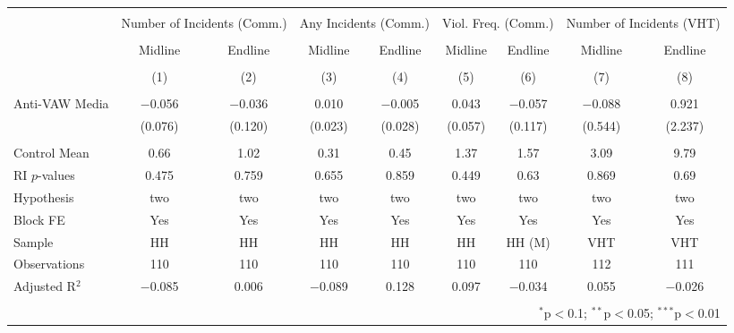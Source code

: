 
\begin{tabular}{@{\extracolsep{5pt}}lcccccccc} 
\\[-1.8ex]\hline 
\hline \\[-1.8ex] 
 & \multicolumn{2}{c}{Number of Incidents (Comm.)} & \multicolumn{2}{c}{Any Incidents (Comm.)} & \multicolumn{2}{c}{Viol. Freq. (Comm.)} & \multicolumn{2}{c}{Number of Incidents (VHT)} \\ 
\\[-1.8ex] & Midline & Endline & Midline & Endline & Midline & Endline & Midline & Endline \\ 
\\[-1.8ex] & (1) & (2) & (3) & (4) & (5) & (6) & (7) & (8)\\ 
\hline \\[-1.8ex] 
 Anti-VAW Media & $-$0.056 & $-$0.036 & 0.010 & $-$0.005 & 0.043 & $-$0.057 & $-$0.088 & 0.921 \\ 
  & (0.076) & (0.120) & (0.023) & (0.028) & (0.057) & (0.117) & (0.544) & (2.237) \\ 
 \hline \\[-1.8ex] 
Control Mean & 0.66 & 1.02 & 0.31 & 0.45 & 1.37 & 1.57 & 3.09 & 9.79 \\ 
RI $p$-values & 0.475 & 0.759 & 0.655 & 0.859 & 0.449 & 0.63 & 0.869 & 0.69 \\ 
Hypothesis & two & two & two & two & two & two & two & two \\ 
Block FE & Yes & Yes & Yes & Yes & Yes & Yes & Yes & Yes \\ 
Sample & HH & HH & HH & HH & HH & HH (M) & VHT & VHT \\ 
Observations & 110 & 110 & 110 & 110 & 110 & 110 & 112 & 111 \\ 
Adjusted R$^{2}$ & $-$0.085 & 0.006 & $-$0.089 & 0.128 & 0.097 & $-$0.034 & 0.055 & $-$0.026 \\ 
\hline 
\hline \\[-1.8ex] 
\multicolumn{9}{r}{$^{*}$p$<$0.1; $^{**}$p$<$0.05; $^{***}$p$<$0.01} \\ 
\end{tabular} 
